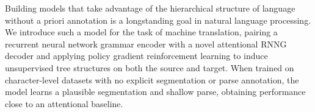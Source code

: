 Building models that take advantage of the hierarchical structure of language without a priori annotation is a longstanding goal in natural language processing. We introduce such a model for the task of machine translation, pairing a recurrent neural network grammar encoder with a novel attentional RNNG decoder and applying policy gradient reinforcement learning to induce unsupervised tree structures on both the source and target. When trained on character-level datasets with no explicit segmentation or parse annotation, the model learns a plausible segmentation and shallow parse, obtaining performance close to an attentional baseline.
